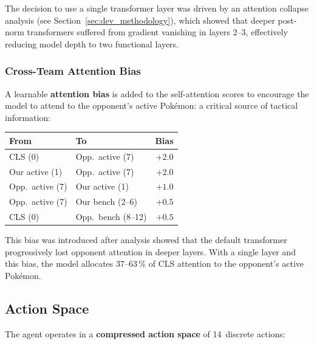 The decision to use a single transformer layer was driven by an attention
collapse analysis (see Section~\ref{sec:dev_methodology}), which showed that deeper
post-norm transformers suffered from gradient vanishing in layers 2--3,
effectively reducing model depth to two functional layers.

\subsubsection{Cross-Team Attention Bias}

A learnable \textbf{attention bias} is added to the self-attention scores to
encourage the model to attend to the opponent's active Pok\'{e}mon: a
critical source of tactical information:

\begin{center}
\small
\begin{tabularx}{0.7\textwidth}{l l r}
  \toprule
  \textbf{From} & \textbf{To} & \textbf{Bias} \\
  \midrule
  CLS (0)         & Opp.\ active (7)  & $+2.0$ \\
  Our active (1)  & Opp.\ active (7)  & $+2.0$ \\
  Opp.\ active (7) & Our active (1)   & $+1.0$ \\
  Opp.\ active (7) & Our bench (2--6) & $+0.5$ \\
  CLS (0)         & Opp.\ bench (8--12) & $+0.5$ \\
  \bottomrule
\end{tabularx}
\end{center}

This bias was introduced after analysis showed that the default transformer
progressively lost opponent attention in deeper layers.  With a single layer
and this bias, the model allocates 37--63\,\% of CLS attention to the
opponent's active Pok\'{e}mon.


\subsection{Action Space}
\label{sec:action_space}

The agent operates in a \textbf{compressed action space} of 14~discrete
actions:

